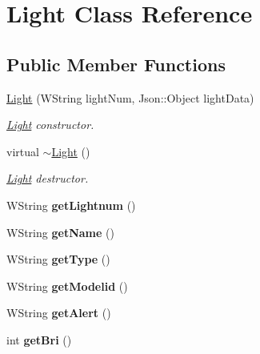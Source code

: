 \hypertarget{classLight}{}\section{Light Class Reference}
\label{classLight}
\subsection*{Public Member Functions}
\begin{DoxyCompactItemize}
\item 
\hyperlink{classLight_a4de0424745908abdc3521a753bb9bd9d}{Light} (W\+String light\+Num, Json\+::\+Object light\+Data)
\begin{DoxyCompactList}\small\item\em \hyperlink{classLight}{Light} constructor. \end{DoxyCompactList}\item 
virtual \hyperlink{classLight_ad0e59fad13bb6cfadc25b2c477e9ddc7}{$\sim$\+Light} ()\hypertarget{classLight_ad0e59fad13bb6cfadc25b2c477e9ddc7}{}\label{classLight_ad0e59fad13bb6cfadc25b2c477e9ddc7}

\begin{DoxyCompactList}\small\item\em \hyperlink{classLight}{Light} destructor. \end{DoxyCompactList}\item 
W\+String {\bfseries get\+Lightnum} ()\hypertarget{classLight_a802605bba167ae6b0e476787f1b76a2f}{}\label{classLight_a802605bba167ae6b0e476787f1b76a2f}

\item 
W\+String {\bfseries get\+Name} ()\hypertarget{classLight_a65bfac7c73046514df5cad0a1950e762}{}\label{classLight_a65bfac7c73046514df5cad0a1950e762}

\item 
W\+String {\bfseries get\+Type} ()\hypertarget{classLight_a4e937d90a2f8b08d72e41164512a16c7}{}\label{classLight_a4e937d90a2f8b08d72e41164512a16c7}

\item 
W\+String {\bfseries get\+Modelid} ()\hypertarget{classLight_a1882c9cee72ebdc329651d20830c77f5}{}\label{classLight_a1882c9cee72ebdc329651d20830c77f5}

\item 
W\+String {\bfseries get\+Alert} ()\hypertarget{classLight_a75f5a38115214ce9ad696ec6f96fa81f}{}\label{classLight_a75f5a38115214ce9ad696ec6f96fa81f}

\item 
int {\bfseries get\+Bri} ()\hypertarget{classLight_a0a86056ce49c7ddfeff8becc21d55b37}{}\label{classLight_a0a86056ce49c7ddfeff8becc21d55b37}


\end{DoxyCompactItemize}
